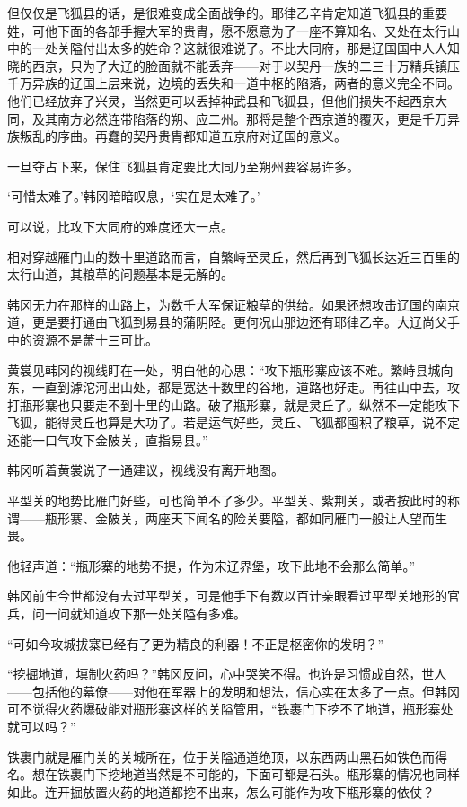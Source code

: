 但仅仅是飞狐县的话，是很难变成全面战争的。耶律乙辛肯定知道飞狐县的重要姓，可他下面的各部手握大军的贵胄，愿不愿意为了一座不算知名、又处在太行山中的一处关隘付出太多的姓命？这就很难说了。不比大同府，那是辽国国中人人知晓的西京，只为了大辽的脸面就不能丢弃——对于以契丹一族的二三十万精兵镇压千万异族的辽国上层来说，边境的丢失和一道中枢的陷落，两者的意义完全不同。他们已经放弃了兴灵，当然更可以丢掉神武县和飞狐县，但他们损失不起西京大同，及其南方必然连带陷落的朔、应二州。那将是整个西京道的覆灭，更是千万异族叛乱的序曲。再蠢的契丹贵胄都知道五京府对辽国的意义。

一旦夺占下来，保住飞狐县肯定要比大同乃至朔州要容易许多。

‘可惜太难了。’韩冈暗暗叹息，‘实在是太难了。’

可以说，比攻下大同府的难度还大一点。

相对穿越雁门山的数十里道路而言，自繁峙至灵丘，然后再到飞狐长达近三百里的太行山道，其粮草的问题基本是无解的。

韩冈无力在那样的山路上，为数千大军保证粮草的供给。如果还想攻击辽国的南京道，更是要打通由飞狐到易县的蒲阴陉。更何况山那边还有耶律乙辛。大辽尚父手中的资源不是萧十三可比。

黄裳见韩冈的视线盯在一处，明白他的心思：“攻下瓶形寨应该不难。繁峙县城向东，一直到滹沱河出山处，都是宽达十数里的谷地，道路也好走。再往山中去，攻打瓶形寨也只要走不到十里的山路。破了瓶形寨，就是灵丘了。纵然不一定能攻下飞狐，能得灵丘也算是大功了。若是运气好些，灵丘、飞狐都囤积了粮草，说不定还能一口气攻下金陂关，直指易县。”

韩冈听着黄裳说了一通建议，视线没有离开地图。

平型关的地势比雁门好些，可也简单不了多少。平型关、紫荆关，或者按此时的称谓——瓶形寨、金陂关，两座天下闻名的险关要隘，都如同雁门一般让人望而生畏。

他轻声道：“瓶形寨的地势不提，作为宋辽界堡，攻下此地不会那么简单。”

韩冈前生今世都没有去过平型关，可是他手下有数以百计亲眼看过平型关地形的官兵，问一问就知道攻下那一处关隘有多难。

“可如今攻城拔寨已经有了更为精良的利器！不正是枢密你的发明？”

“挖掘地道，填制火药吗？”韩冈反问，心中哭笑不得。也许是习惯成自然，世人——包括他的幕僚——对他在军器上的发明和想法，信心实在太多了一点。但韩冈可不觉得火药爆破能对瓶形寨这样的关隘管用，“铁裹门下挖不了地道，瓶形寨处就可以吗？”

铁裹门就是雁门关的关城所在，位于关隘通道绝顶，以东西两山黑石如铁色而得名。想在铁裹门下挖地道当然是不可能的，下面可都是石头。瓶形寨的情况也同样如此。连开掘放置火药的地道都挖不出来，怎么可能作为攻下瓶形寨的依仗？

